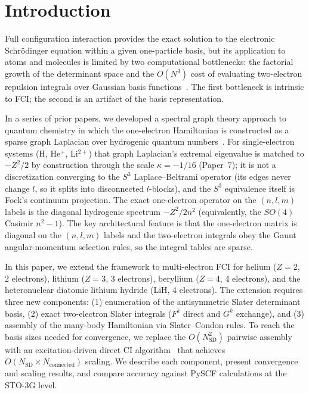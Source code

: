 \documentclass[aps,pra,twocolumn,superscriptaddress,longbibliography,floatfix]{revtex4-2}
\begin{document}
\maketitle

\section{Introduction}
\label{sec:introduction}

Full configuration interaction provides the exact solution to the
electronic Schr\"odinger equation within a given one-particle basis,
but its application to atoms and molecules is limited by two
computational bottlenecks: the factorial growth of the determinant
space and the $O(N^4)$ cost of evaluating two-electron repulsion
integrals over Gaussian basis functions~\cite{Szabo1996,Helgaker2000}.
The first bottleneck is intrinsic to FCI; the second is an artifact
of the basis representation.

In a series of prior papers, we developed a spectral graph theory
approach to quantum chemistry in which the one-electron Hamiltonian
is constructed as a sparse graph Laplacian over hydrogenic quantum
numbers~\cite{Loutey2026a,Loutey2026b,Loutey2026c}.
For single-electron systems (H, He$^+$, Li$^{2+}$) that graph
Laplacian's extremal eigenvalue is matched to $-Z^2/2$ by construction
through the scale $\kappa = -1/16$ (Paper~7); it is not a
discretization converging to the $S^3$ Laplace--Beltrami operator (its
edges never change $l$, so it splits into disconnected $l$-blocks), and
the $S^3$ equivalence itself is Fock's continuum projection.  The
exact one-electron operator on the $(n,l,m)$ labels is the diagonal
hydrogenic spectrum $-Z^2/2n^2$ (equivalently, the $SO(4)$ Casimir
$n^2-1$).
The key architectural feature is that the one-electron matrix is
diagonal on the $(n,l,m)$ labels and the two-electron integrals obey
the Gaunt angular-momentum selection rules, so the integral tables are
sparse.

In this paper, we extend the framework to multi-electron FCI for
helium ($Z=2$, 2 electrons), lithium ($Z=3$, 3 electrons),
beryllium ($Z=4$, 4 electrons), and the heteronuclear diatomic
lithium hydride (LiH, 4 electrons).
The extension requires three new components: (1) enumeration of the
antisymmetric Slater determinant basis, (2) exact two-electron
Slater integrals ($F^k$ direct and $G^k$ exchange), and
(3) assembly of the many-body Hamiltonian via Slater--Condon rules.
To reach the basis sizes needed for convergence, we replace the
$O(N_{\text{SD}}^2)$ pairwise assembly with an excitation-driven
direct CI algorithm~\cite{Knowles1984} that achieves
$O(N_{\text{SD}} \times N_{\text{connected}})$ scaling.
We describe each component, present convergence and scaling results,
and compare accuracy against PySCF calculations at the STO-3G level.
\end{document}
